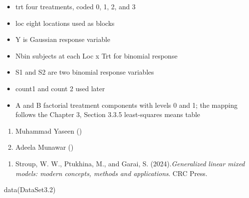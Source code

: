 \documentclass[a4paper]{book}
\begin{document}
\begin{Details}
\begin{itemize}

\item{} trt              four treatments, coded 0, 1, 2, and 3
\item{} loc              eight locations used as blocks
\item{} Y                is Gaussian response variable
\item{} Nbin             subjects at each Loc x Trt for binomial response
\item{} S1 and S2        are two binomial response variables
\item{} count1 and count 2 used later
\item{} A and B          factorial treatment components with levels 0 and 1;
the mapping follows the Chapter 3, Section 3.3.5
 least-squares means table

\end{itemize}

\end{Details}
%
\begin{Author}
\begin{enumerate}

\item{}  Muhammad Yaseen ()
\item{} Adeela Munawar ()

\end{enumerate}

\end{Author}
%
\begin{References}
\begin{enumerate}

\item{} Stroup, W. W., Ptukhina, M., and Garai, S. (2024).\emph{Generalized linear mixed models: modern concepts, methods and applications}.
CRC Press.

\end{enumerate}

\end{References}
%
\begin{SeeAlso}
\end{SeeAlso}
%
\begin{Examples}
\begin{ExampleCode}
data(DataSet3.2)
\end{ExampleCode}
\end{Examples}
\end{document}
